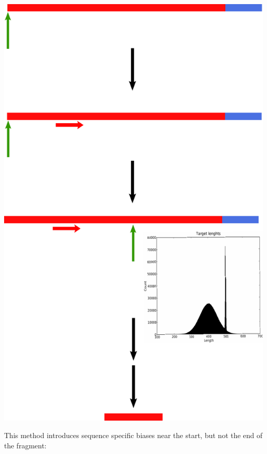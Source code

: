 \begin{center}
\includegraphics[scale=0.6]{pix/prim_jump.pdf}
\end{center}

This method introduces sequence specific biases near the start, but not the end of the fragment:

